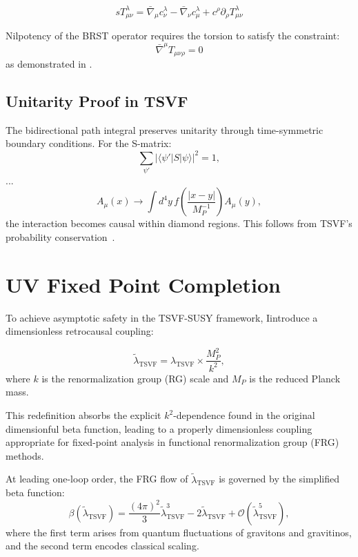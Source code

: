 \documentclass[twocolumn,superscriptaddress,floatfix]{revtex4-2}
\begin{document}
\begin{equation}
sT^\lambda_{\mu\nu} = \bar\nabla_\mu c^\lambda_\nu - \bar\nabla_\nu c^\lambda_\mu + c^\rho\partial_\rho T^\lambda_{\mu\nu}
\label{eq:brst_torsion}
\end{equation}

\noindent Nilpotency of the BRST operator requires the torsion to satisfy the constraint:
\[
\bar\nabla^\mu T_{\mu\nu\rho} = 0
\]
as demonstrated in \cite{Henneaux:1992}. 

\subsection{Unitarity Proof in TSVF}
\label{subsec:unitarity}

The bidirectional path integral preserves unitarity through time-symmetric boundary conditions. For the S-matrix:
\begin{equation}
\sum_{\psi'} |\langle \psi'| S | \psi \rangle|^2 = 1,
\label{eq:s_matrix_unitarity}
\end{equation}
...
\begin{equation}
A_\mu(x) \rightarrow \int d^4y \, f\left(\frac{|x-y|}{M_P^{-1}}\right)A_\mu(y),
\label{eq:smearing}
\end{equation}
the interaction becomes causal within diamond regions.
This follows from TSVF's probability conservation~\cite{Aharonov1964, Vaidman2008}.


\section{UV Fixed Point Completion}
\label{sec:uv_fixed}

To achieve asymptotic safety in the TSVF-SUSY framework, Iintroduce a dimensionless retrocausal coupling:

\begin{equation}
\tilde{\lambda}_{\text{TSVF}} = \lambda_{\text{TSVF}} \times \frac{M_P^2}{k^2},
\end{equation}
where \(k\) is the renormalization group (RG) scale and \(M_P\) is the reduced Planck mass.

This redefinition absorbs the explicit \(k^2\)-dependence found in the original dimensionful beta function, leading to a properly dimensionless coupling appropriate for fixed-point analysis in functional renormalization group (FRG) methods.

At leading one-loop order, the FRG flow of \(\tilde{\lambda}_{\text{TSVF}}\) is governed by the simplified beta function:
\begin{equation}
\beta(\tilde{\lambda}_{\text{TSVF}}) = \frac{(4\pi)^2}{3} \tilde{\lambda}_{\text{TSVF}}^3 - 2\tilde{\lambda}_{\text{TSVF}} + \mathcal{O}(\tilde{\lambda}_{\text{TSVF}}^5),
\end{equation}
where the first term arises from quantum fluctuations of gravitons and gravitinos, and the second term encodes classical scaling.
\end{document}
